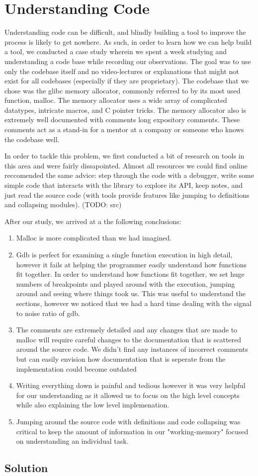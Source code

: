 \chapter{Understanding Code}
Understanding code can be difficult, and blindly building a tool to improve the process is likely to get nowhere. As such, in order to learn how we can help build a tool, we conducted a case study wherein we spent a week studying and understanding a code base while recording our observations. The goal was to use only the codebase itself and no video-lectures or explanations that might not exist for all codebases (especially if they are proprietary). The codebase that we chose was the glibc memory allocator, commonly referred to by its most used function, malloc. The memory allocator uses a wide array of complicated datatypes, intricate macros, and C pointer tricks. The memory allocator also is extremely well documented with comments long expository comments. These comments act as a stand-in for a mentor at a company or someone who knows the codebase well.

In order to tackle this problem, we first conducted a bit of research on tools in this area and were fairly dissapointed. Almost all resources we could find online reccomended the same advice: step through the code with a debugger, write some simple code that interacts with the library to explore its API, keep notes, and just read the source code (with tools provide features like jumping to definitions and collapsing modules). (TODO: src)

\noindent After our study, we arrived at a the following conclusions:
\begin{enumerate}
    \item Malloc is more complicated than we had imagined.
    \item Gdb is perfect for examining a single function execution in high detail, however it fails at helping the programmer easily understand how functions fit together. In order to understand how functions fit together, we set huge numbers of breakpoints and played around with the execution, jumping around and seeing where things took us. This was useful to understand the sections, however we noticed that we had a hard time dealing with the signal to noise ratio of gdb. 
    \item The comments are extremely detailed and any changes that are made to malloc will require careful changes to the documentation that is scattered around the source code. We didn't find any instances of incorrect comments but can easily envision how documentation that is seperate from the implementation could become outdated
    \item Writing everything down is painful and tedious however it was very helpful for our understanding as it allowed us to focus on the high level concepts while also explaining the low level implemenation.
    \item Jumping around the source code with definitions and code collapsing was critical to keep the amount of information in our "working-memory" focused on understanding an individual task.
\end{enumerate}

\section{Solution}

